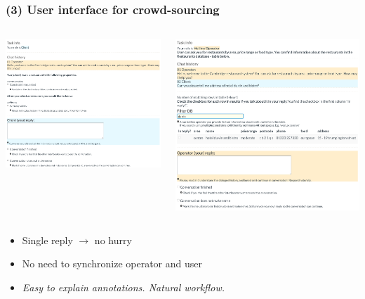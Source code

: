 \documentclass[10pt, compress,british,xcolor={svgnames,dvipsnames,x11names},trans]{beamer}
\begin{document}
\begin{frame}\frametitle{(3) User interface for crowd-sourcing}
\begin{columns}
\begin{column}{0.50\textwidth}
    \includegraphics[width=1.10\textwidth]{./gui-annotators-client.png}
\end{column}
\begin{column}{0.50\textwidth}
    \includegraphics[width=1.00\textwidth]{./gui-annotators-system.png}
\end{column}
\end{columns}
    \begin{itemize}
        \item Single reply $\longrightarrow$ no hurry
        \item No need to synchronize operator and user
        \item {\it \color{darkgreen} Easy to explain annotations. Natural workflow.}
    \end{itemize}
\end{frame}
\end{document}
